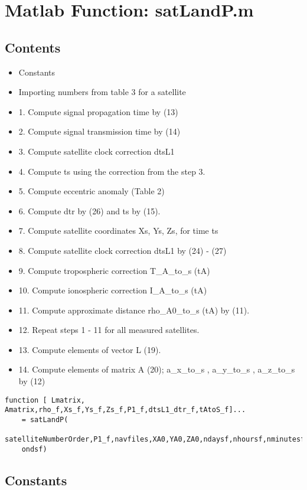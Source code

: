 \section{Matlab Function: satLandP.m} %
\label{sec:matlab_function_satlandp_m}

\subsection*{Contents}

\begin{itemize}
\setlength{\itemsep}{-1ex}
   \item Constants
   \item Importing numbers from table 3 for a satellite
   \item 1. Compute signal propagation time by (13)
   \item 2. Compute signal transmission time by (14)
   \item 3. Compute satellite clock correction dtsL1
   \item 4. Compute ts using the correction from the step 3.
   \item 5. Compute eccentric anomaly (Table 2)
   \item 6. Compute dtr by (26) and ts by (15).
   \item 7. Compute satellite coordinates Xs, Ys, Zs, for time ts
   \item 8. Compute satellite clock correction dtsL1 by (24) - (27)
   \item 9. Compute tropospheric correction T\_A\_to\_s (tA)
   \item 10. Compute ionospheric correction I\_A\_to\_s (tA)
   \item 11. Compute approximate distance rho\_A0\_to\_s (tA) by (11).
   \item 12. Repeat steps 1 - 11 for all measured satellites.
   \item 13. Compute elements of vector L (19).
   \item 14. Compute elements of matrix A (20); a\_x\_to\_s , a\_y\_to\_s , a\_z\_to\_s by (12)
\end{itemize}
\begin{verbatim}
function [ Lmatrix, Amatrix,rho_f,Xs_f,Ys_f,Zs_f,P1_f,dtsL1_dtr_f,tAtoS_f]...
    = satLandP( 
	satelliteNumberOrder,P1_f,navfiles,XA0,YA0,ZA0,ndaysf,nhoursf,nminutesf,nsec
	ondsf)
\end{verbatim}


\subsection*{Constants}

